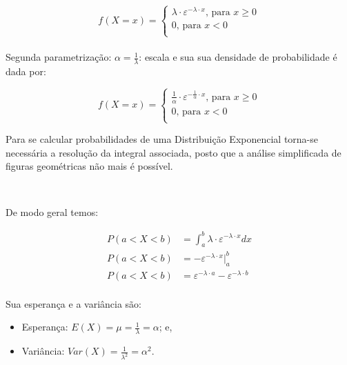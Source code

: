 \documentclass[
]{book}
\providecommand{\tightlist}{%
  \setlength{\itemsep}{0pt}\setlength{\parskip}{0pt}}
\begin{document}
\hfill\break

\[
f(X=x)=
\begin{cases}
    \lambda \cdot \varepsilon ^{-\lambda \cdot x} \text{, para } x \ge 0 \\
    0 \text{, para } x < 0\\
\end{cases}
\]\\

Segunda parametrização: \(\alpha=\frac{1}{\lambda}\): escala e sua sua densidade de probabilidade é dada por:

\hfill\break

\[
f(X=x)=
\begin{cases}
    \frac{1}{\alpha} \cdot \varepsilon ^{-\frac{1}{\alpha} \cdot x} \text{, para } x \ge 0 \\
    0 \text{, para } x < 0\\
\end{cases}
\]

\hfill\break

Para se calcular probabilidades de uma Distribuição Exponencial torna-se necessária a resolução da integral associada, posto que a análise simplificada de figuras geométricas não mais é possível.

~

De modo geral temos:

\hfill\break

\begin{align*}
P( a < X < b) & = \int_{a}^{b}  \lambda \cdot \varepsilon ^{- \lambda \cdot x} dx \\
P( a < X < b) & = - \varepsilon^{-\lambda \cdot x} \rvert_{a}^{b} \\ 
P( a < X < b) & = \varepsilon^{-\lambda \cdot a} - \varepsilon^{-\lambda \cdot b} \\  
\end{align*}

\hfill\break

Sua esperança e a variância são:

\hfill\break

\begin{itemize}
\tightlist
\item
  Esperança: \(E(X) = \mu = \frac{1}{\lambda}=\alpha\); e,\\
\item
  Variância: \(Var(X) = \frac{1}{\lambda^{2}}=\alpha^{2}\).
\end{itemize}

\hfill\break
\end{document}
